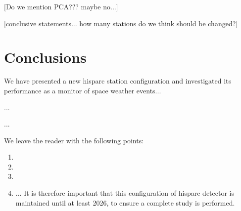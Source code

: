 [Do we mention PCA??? maybe no...]

[conclusive statements... how many stations do we think should be changed?]


\section{Conclusions}\label{sec:HS_14008_conclusion}

We have presented a new \gls{hisparc} station configuration and investigated its performance as a monitor of space weather events...

...

...


We leave the reader with the following points:

\begin{enumerate}
	\item{}

	\item{}
	
	\item{}
	
	\item{... It is therefore important that this configuration of \gls{hisparc} detector is maintained until at least 2026, to ensure a complete study is performed.}
\end{enumerate}